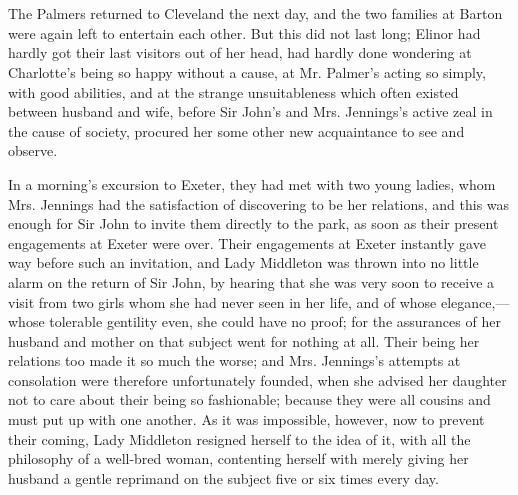 

\chapter{} %

The Palmers returned to Cleveland the next day, and the two families at Barton were again left to entertain each other. But this did not last long; Elinor had hardly got their last visitors out of her head, had hardly done wondering at Charlotte's being so happy without a cause, at Mr. Palmer's acting so simply, with good abilities, and at the strange unsuitableness which often existed between husband and wife, before Sir John's and Mrs. Jennings's active zeal in the cause of society, procured her some other new acquaintance to see and observe.

In a morning's excursion to Exeter, they had met with two young ladies, whom Mrs. Jennings had the satisfaction of discovering to be her relations, and this was enough for Sir John to invite them directly to the park, as soon as their present engagements at Exeter were over. Their engagements at Exeter instantly gave way before such an invitation, and Lady Middleton was thrown into no little alarm on the return of Sir John, by hearing that she was very soon to receive a visit from two girls whom she had never seen in her life, and of whose elegance,---whose tolerable gentility even, she could have no proof; for the assurances of her husband and mother on that subject went for nothing at all. Their being her relations too made it so much the worse; and Mrs. Jennings's attempts at consolation were therefore unfortunately founded, when she advised her daughter not to care about their being so fashionable; because they were all cousins and must put up with one another. As it was impossible, however, now to prevent their coming, Lady Middleton resigned herself to the idea of it, with all the philosophy of a well-bred woman, contenting herself with merely giving her husband a gentle reprimand on the subject five or six times every day.

